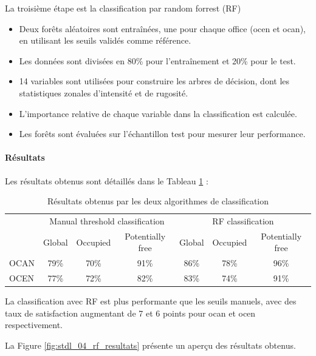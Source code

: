 \par{La troisième étape est la classification par random forrest (RF)}
\begin{itemize}
    \item Deux forêts aléatoires sont entraînées, une pour chaque office (\acrshort{ocen} et \acrshort{ocan}), en utilisant les seuils validés comme référence.
    \item Les données sont divisées en 80\% pour l'entraînement et 20\% pour le test.
    \item 14 variables sont utilisées pour construire les arbres de décision, dont les statistiques zonales d'intensité et de rugosité.
    \item L'importance relative de chaque variable dans la classification est calculée.
    \item Les forêts sont évaluées sur l'échantillon test pour mesurer leur performance.
\end{itemize}

\paragraph{Résultats}
\par{Les résultats obtenus sont détaillés dans le Tableau \ref{tab:stdl_01_resultats_classification} :}
\begin{table}[h]
    \centering
    \begin{tabular}{|l|c|c|c||c|c|c|}
    \hline
    \multirow{2}{*}{} & \multicolumn{3}{c||}{Manual threshold classification} & \multicolumn{3}{c|}{RF classification} \\
    \cline{2-7}
    & Global & Occupied & Potentially free & Global & Occupied & Potentially free \\
    \hline
    OCAN & 79\% & 70\% & 91\% & 86\% & 78\% & 96\% \\
    OCEN & 77\% & 72\% & 82\% & 83\% & 74\% & 91\% \\
    \hline
    \end{tabular}
    \caption{Résultats obtenus par les deux algorithmes de classification}
    \label{tab:stdl_01_resultats_classification}
\end{table}
\par{La classification avec RF est plus performante que les seuils manuels, avec des taux de satisfaction augmentant de 7 et 6 points pour \acrshort{ocan} et \acrshort{ocen} respectivement.}

La Figure \ref{fig:stdl_04_rf_resultats} présente un aperçu des résultats obtenus.

